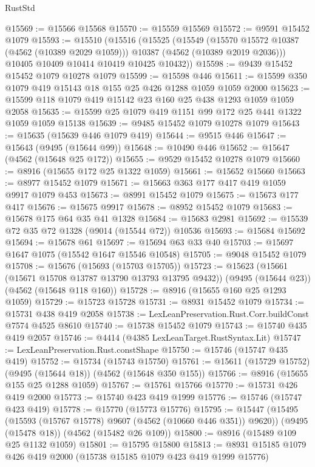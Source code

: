 \begin{lexlean}{RustStd}
\begin{coremodule}
@15569 := @15566 @15568
@15570 := @15559 @15569
@15572 := @9591 @15452 @1079
@15593 := @15510
    (@15516
      (@15525
        (@15549
          (@15570 @15572 @10387 (@4562 (@10389 @2029 @1059)))
          @10387
          (@4562 (@10389 @2019 @2036)))
        @10405
        @10409
        @10414
        @10419
        @10425
        @10432))
@15598 := @9439 @15452 @15452 @1079 @10278 @1079
@15599 := @15598 @446
@15611 := @15599 @350 @1079 @419 @15143 @18 @155 @25 @426 @1288 @1059 @1059 @2000
@15623 := @15599 @118 @1079 @419 @15142 @23 @160 @25 @438 @1293 @1059 @1059 @2058
@15635 := @15599 @25 @1079 @419 @1151 @99 @172 @25 @441 @1322 @1059 @1059 @15138
@15639 := @9485 @15452 @1079 @10278 @1079
@15643 := @15635 (@15639 @446 @1079 @419)
@15644 := @9515 @446
@15647 := @15643 (@9495 (@15644 @99))
@15648 := @10490 @446
@15652 := @15647 (@4562 (@15648 @25 @172))
@15655 := @9529 @15452 @10278 @1079
@15660 := @8916 (@15655 @172 @25 @1322 @1059)
@15661 := @15652 @15660
@15663 := @8977 @15452 @1079
@15671 := @15663 @363 @177 @417 @419 @1059 @9917 @1079 @453
@15673 := @8991 @15452 @1079
@15675 := @15673 @177 @417
@15676 := @15675 @9917
@15678 := @8952 @15452 @1079
@15683 := @15678 @175 @64 @35 @41 @1328
@15684 := @15683 @2981
@15692 := @15539 @72 @35 @72 @1328 (@9014 (@15544 @72)) @10536
@15693 := @15684 @15692
@15694 := @15678 @61
@15697 := @15694 @63 @33 @40
@15703 := @15697 @1647 @1075 (@15542 @1647 @15546 @10548)
@15705 := @9048 @15452 @1079
@15708 := @15676 (@15693 (@15703 @15705))
@15723 := @15623
    (@15661 (@15671 @15708 @13787 @13790 @13793 @13795 @9432))
    (@9495 (@15644 @23))
    (@4562 (@15648 @118 @160))
@15728 := @8916 (@15655 @160 @25 @1293 @1059)
@15729 := @15723 @15728
@15731 := @8931 @15452 @1079
@15734 := @15731 @438 @419 @2058
@15738 := LexLeanPreservation.Rust.Corr.buildConst @7574 @4525 @8610
@15740 := @15738 @15452 @1079
@15743 := @15740 @435 @419 @2057
@15746 := @4414 (@4385 LexLeanTarget.RustSyntax.Lit)
@15747 := LexLeanPreservation.Rust.constShape
@15750 := @15746 (@15747 @435 @419)
@15752 := @15734 (@15743 @15750)
@15761 := @15611 (@15729 @15752) (@9495 (@15644 @18)) (@4562 (@15648 @350 @155))
@15766 := @8916 (@15655 @155 @25 @1288 @1059)
@15767 := @15761 @15766
@15770 := @15731 @426 @419 @2000
@15773 := @15740 @423 @419 @1999
@15776 := @15746 (@15747 @423 @419)
@15778 := @15770 (@15773 @15776)
@15795 := @15447
    (@15495 (@15593 (@15767 @15778) @9607 (@4562 (@10660 @446 @351)) @9620))
    (@9495 (@15478 @18))
    (@4562 (@15482 @26 @109))
@15800 := @8916 (@15489 @109 @25 @1132 @1059)
@15801 := @15795 @15800
@15813 := @8931 @15185 @1079 @426 @419 @2000 (@15738 @15185 @1079 @423 @419 @1999 @15776)

\end{coremodule}
\end{lexlean}
